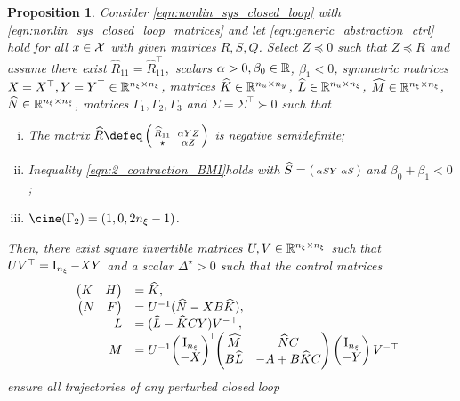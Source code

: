 \documentclass{ifacconf}
\newtheorem{proposition}{Proposition}
\begin{document}
\begin{proposition}
    \label{prp:2_contr_BMI}
     Consider  \eqref{eqn:nonlin_sys_closed_loop} with \eqref{eqn:nonlin_sys_closed_loop_matrices} %
and let \eqref{eqn:generic_abstraction_ctrl} hold for all  $x\in{\mathcal{X}}$  with given matrices $R, S, Q$. Select $Z\preceq 0$ such that $Z\preceq R$ and assume there exist $ \widehat R_{11}=\widehat R_{11}^\top,$   scalars $\alpha>0,\beta_0\in{\mathbb{R}}$, $\beta_1<0$,  symmetric matrices $X=X^\top, Y=Y^\top \in {\mathbb{R}}^{n_\xi\times n_\xi}$, matrices $\widehat K \in {\mathbb{R}}^{n_u\times n_y}$, $\widehat L\in {\mathbb{R}}^{n_u\times n_\xi}$, $\widehat M\in {\mathbb{R}}^{n_\xi\times n_\xi}$, $\widehat N \in {\mathbb{R}}^{n_\xi\times n_\xi}$,  matrices $\Gamma_1, \Gamma_2, \Gamma_3$  and $\Sigma=\Sigma^\top\succ 0$  such that 
\begin{enumerate}[i)]
        \item The matrix $\widehat R \defeq \smallpmat{\widehat R_{11} && \alpha YZ\\ \star && \alpha Z}$ is negative semidefinite;
         \item Inequality \eqref{eqn:2_contraction_BMI}\footnotemark[1] holds with $\widehat S = \left(\begin{smallmatrix}   \alpha SY & \alpha S \end{smallmatrix} \right)$ and $\beta_0+\beta_1<0$;
        \item $\cine(\Gamma_2)=(1, 0, 2n_\xi-1)$.
    \end{enumerate}
     Then, 
     there exist square invertible matrices $U,V\in {\mathbb{R}}^{n_\xi\times n_\xi}$ such that $UV^\top = \operatorname{I}_{n_\xi}- XY$
    and a scalar $\Delta^\star>0$ such that the control matrices 
    \begin{equation}
    \label{eqn:ctrl_matrices}
    \begin{array}{rl}
          \pmx{K & H}&= \widehat K,  \\
         \pmx{N& F}&= U^{-1} (\widehat N - X B \widehat K) ,\\
           L & = (\widehat L - \widehat K C Y) V^{-\top},\\
         M&=U^{-1}\!\pmx{\Id_{n_\xi}\\-X}^{\!\top}\!\!\pmx{\widehat M & \widehat N C\\
         B \widehat L & -A+ B\widehat  KC}\pmx{\Id_{n_\xi}\\-Y}V^{-\top}\!\!\!\!\!\!
    \end{array}
\end{equation}
    ensure all trajectories of any perturbed closed loop
\begin{equation}

\end{equation}
\end{proposition}
\end{document}
